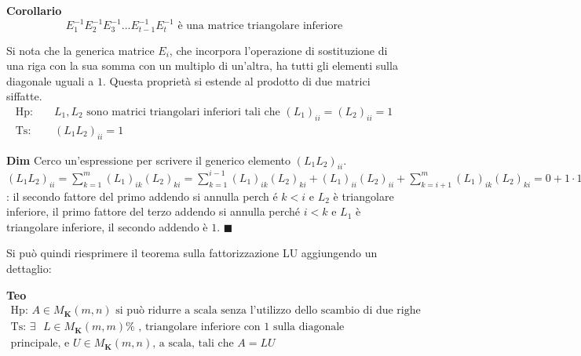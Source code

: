 \documentclass{article}
\begin{document}
\textbf{Corollario} 
\begin{equation*}
E_{1}^{-1}E_{2}^{-1}E_{3}^{-1}...E_{t-1}^{-1}E_{t}^{-1}\text{ \`{e} una
matrice triangolare inferiore}
\end{equation*}

Si nota che la generica matrice $E_{i}$, che incorpora l'operazione di
sostituzione di una riga con la sua somma con un multiplo di un'altra, ha
tutti gli elementi sulla diagonale uguali a $1$. Questa propriet\`{a} si
estende al prodotto di due matrici siffatte.%
\begin{eqnarray*}
\text{Hp}\text{: } &&L_{1},L_{2}\text{ sono matrici triangolari inferiori
tali che }\left( L_{1}\right) _{ii}=\left( L_{2}\right) _{ii}=1 \\
\text{Ts}\text{: } &&\left( L_{1}L_{2}\right) _{ii}=1
\end{eqnarray*}

\textbf{Dim} Cerco un'espressione per scrivere il generico elemento $\left(
L_{1}L_{2}\right) _{ii}$. $\left( L_{1}L_{2}\right)
_{ii}=\sum_{k=1}^{m}\left( L_{1}\right) _{ik}\left( L_{2}\right)
_{ki}=\sum_{k=1}^{i-1}\left( L_{1}\right) _{ik}\left( L_{2}\right)
_{ki}+\left( L_{1}\right) _{ii}\left( L_{2}\right)
_{ii}+\sum_{k=i+1}^{m}\left( L_{1}\right) _{ik}\left( L_{2}\right)
_{ki}=0+1\cdot 1+0$: il secondo fattore del primo addendo si annulla perch%
\'{e} $k<i$ e $L_{2}$ \`{e} triangolare inferiore, il primo fattore del
terzo addendo si annulla perch\'{e} $i<k$ e $L_{1}$ \`{e} triangolare
inferiore, il secondo addendo \`{e} $1$. $\blacksquare $

Si pu\`{o} quindi riesprimere il teorema sulla fattorizzazione LU
aggiungendo un dettaglio:

\textbf{Teo}%
\begin{gather*}
\text{Hp}\text{: }A\in M_{\mathbf{K}}\left( m,n\right) \text{ si pu\`{o}
ridurre a scala senza l'utilizzo dello scambio di due righe} \\
\text{Ts}\text{: }\exists \text{ }L\in M_{\mathbf{K}}\left( m,m\right) \text{%
, triangolare inferiore con }1\text{ sulla diagonale } \\
\text{principale, e }U\in M_{\mathbf{K}}\left( m,n\right) \text{, a scala,
tali che }A=LU
\end{gather*}
\end{document}

